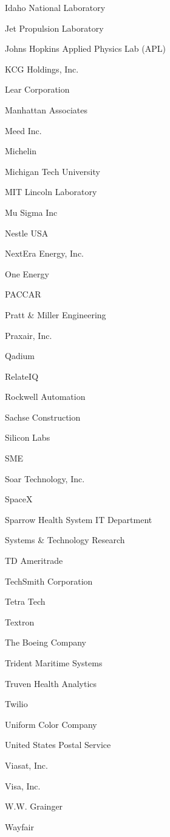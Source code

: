 \documentclass[twoside]{article}
\begin{document}
\begin{center}
\begin{multicols}{5}
\begin{FlushLeft}
\begin{compactitem}
\item Idaho National Laboratory
\item Jet Propulsion Laboratory
\item Johns Hopkins Applied Physics Lab (APL)
\item KCG Holdings, Inc.
\item Lear Corporation
\item Manhattan Associates
\item Meed Inc.
\item Michelin
\item Michigan Tech University
\item MIT Lincoln Laboratory
\item Mu Sigma Inc
\item Nestle USA
\item NextEra Energy, Inc.
\item One Energy
\item PACCAR
\item Pratt \& Miller Engineering
\item Praxair, Inc.
\item Qadium
\item RelateIQ
\item Rockwell Automation
\item Sachse Construction
\item Silicon Labs
\item SME
\item Soar Technology, Inc.
\item SpaceX
\item Sparrow Health System IT Department
\item Systems \& Technology Research
\item TD Ameritrade
\item TechSmith Corporation
\item Tetra Tech
\item Textron
\item The Boeing Company
\item Trident Maritime Systems
\item Truven Health Analytics
\item Twilio
\item Uniform Color Company
\item United States Postal Service
\item Viasat, Inc.
\item Visa, Inc.
\item W.W. Grainger
\item Wayfair

\end{compactitem}
\end{FlushLeft}
\end{multicols}
\end{center}
\end{document}
